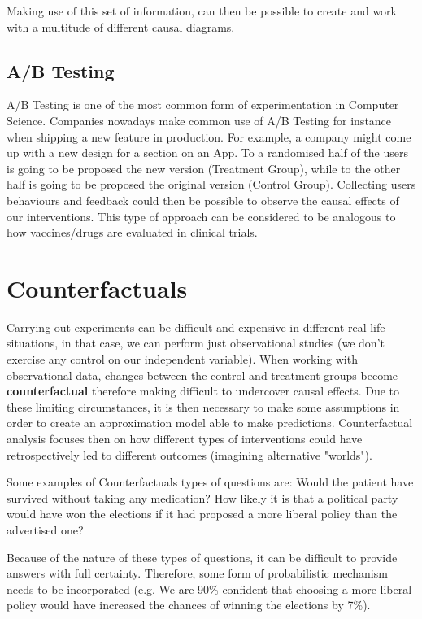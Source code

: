 Making use of this set of information, can then be possible to create and work with a multitude of different causal diagrams.

\vspace{-0.2cm}
\subsection{A/B Testing}
\label{testing}
\vspace{-0.2cm}
A/B Testing is one of the most common form of experimentation in Computer Science. Companies nowadays make common use of A/B Testing for instance when shipping a new feature in production. For example, a company might come up with a new design for a section on an App. To a randomised half of the users is going to be proposed the new version (Treatment Group), while to the other half is going to be proposed the original version (Control Group). Collecting users behaviours and feedback could then be possible to observe the causal effects of our interventions. This type of approach can be considered to be analogous to how vaccines/drugs are evaluated in clinical trials.

\section{Counterfactuals}
Carrying out experiments can be difficult and expensive in different real-life situations, in that case, we can perform just observational studies (we don't exercise any control on our independent variable). When working with observational data, changes between the control and treatment groups become \textbf{counterfactual} therefore making difficult to undercover causal effects. Due to these limiting circumstances, it is then necessary to make some assumptions in order to create an approximation model able to make predictions. Counterfactual analysis focuses then on how different types of interventions could have retrospectively led to different outcomes (imagining alternative "worlds"). 

Some examples of Counterfactuals types of questions are: Would the patient have survived without taking any medication? How likely it is that a political party would have won the elections if it had proposed a more liberal policy than the advertised one? 

Because of the nature of these types of questions, it can be difficult to provide answers with full certainty. Therefore, some form of probabilistic mechanism needs to be incorporated (e.g. We are 90\% confident that choosing a more liberal policy would have increased the chances of winning the elections by 7\%).

